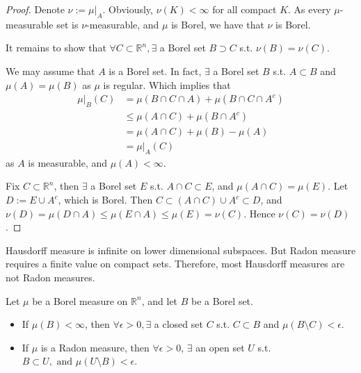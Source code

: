     \begin{proof}
        Denote $\nu:=\mu|_{A}$. Obviously, $\nu(K)<\infty$ for all compact $K$. As every $\mu$-measurable set is $\nu$-measurable, and $\mu$ is Borel, we have that $\nu$ is Borel.

        It remains to show that $\forall C\subset \mathbb{R}^{n},\exists$ a Borel set $B\supset C$ s.t. $\nu(B)=\nu(C)$.

        We may assume that $A$ is a Borel set. In fact, $\exists$ a Borel set $B$ s.t. $A \subset B$ and $\mu(A)=\mu(B)$ as $\mu$ is regular. Which implies that
        \[
        \begin{aligned}
        \mu|_{B}(C)&=\mu(B\cap C\cap A)+\mu(B\cap C\cap A^{c}) \\
        & \leq \mu(A\cap C)+\mu(B\cap A^{c}) \\
        & = \mu(A\cap C)+\mu(B)-\mu(A) \\
        & = \mu|_{A}(C)
        \end{aligned}
        \]
        as $A$ is measurable, and $\mu(A)<\infty$.

        Fix $C\subset \mathbb{R}^{n}$, then $\exists$ a Borel set $E$ s.t. $A\cap C\subset E$, and $\mu(A\cap C)=\mu(E)$. Let $D:=E\cup A^{c}$, which is Borel. Then $C\subset(A\cap C)\cup A^{c}\subset D$, and $\nu(D)=\mu(D\cap A)\leq \mu(E\cap A)\leq \mu(E)=\nu(C)$.
        Hence $\nu(C)=\nu(D)$.
    \end{proof}

    \begin{remark}
        Hausdorff measure is infinite on lower dimensional subspaces. But Radon measure requires a finite value on compact sets. Therefore, most Hausdorff measures are not Radon measures.
    \end{remark}

    \begin{lemma}
        Let $\mu$ be a Borel measure on $\mathbb{R}^{n}$, and let $B$ be a Borel set.
        \begin{itemize}
            \item[(i)] If $\mu(B)<\infty$, then $\forall \epsilon>0, \exists$ a closed set $C$ s.t. $C\subset B$ and $\mu(B\setminus C)<\epsilon$.
            \item[(ii)] If $\mu$ is a Radon measure, then $\forall \epsilon >0$, $\exists$ an open set $U$ s.t. $B\subset U, \text{ and }\mu(U\setminus B)<\epsilon$.
        \end{itemize}
    \end{lemma}


